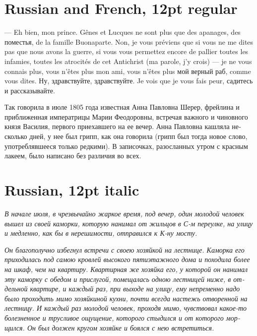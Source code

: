 \documentclass[12pt]{book}
\newcommand{\cyrillicfont}{\stdfont}
\newcommand{\russ}[1]{\textrussian{\cyrillicfont#1}}
\begin{document}
\section*{Russian and French, 12pt regular}

\noindent\textfrench{— Eh bien, mon prince. Gênes et Lucques ne sont plus que des apanages,
des поместья, de la famille Buonaparte. Non, je vous préviens que si
vous ne me dites pas que nous avons la guerre, si vous vous permettez
encore de pallier toutes les infamies, toutes les atrocités de cet
Antichrist (ma parole, j'y crois) — je ne vous connais plus, vous
n'êtes plus mon ami, vous n'êtes plus} \russ{мой верный раб, comme vous
dites. Ну, здравствуйте, здравствуйте. Je vois que je vous fais
peur, садитесь и рассказывайте.}

\russ{Так говорила в июле 1805 года известная Анна Павловна Шерер, фрейлина
и приближенная императрицы Марии Феодоровны, встречая важного и
чиновного князя Василия, первого приехавшего на ее вечер. Анна
Павловна кашляла несколько дней, у нее был грипп, как она говорила
(грипп был тогда новое слово, употреблявшееся только редкими). В
записочках, разосланных утром с красным лакеем, было написано без
различия во всех.}

\section*{Russian, 12pt italic}

\russ{\itshape В начале июля, в чрезвычайно жаркое время, под вечер, один молодой
человек вышел из своей каморки, которую нанимал от жильцов в С-м
переулке, на улицу и медленно, как бы в нерешимости, отправился к К-ну
мосту.}

\russ{\itshape Он благополучно избегнул встречи с своею хозяйкой на лестнице. Каморка
его приходилась под самою кровлей высокого пятиэтажного дома и
походила более на шкаф, чем на квартиру. Квартирная же хозяйка его, у
которой он нанимал эту каморку с обедом и прислугой, помещалась одною
лестницей ниже, в отдельной квартире, и каждый раз, при выходе на
улицу, ему непременно надо было проходить мимо хозяйкиной кухни, почти
всегда настежь отворенной на лестницу. И каждый раз молодой человек,
проходя мимо, чувствовал какое-то болезненное и трусливое ощущение,
которого стыдился и от которого морщился. Он был должен кругом хозяйке
и боялся с нею встретиться.}
\end{document}
